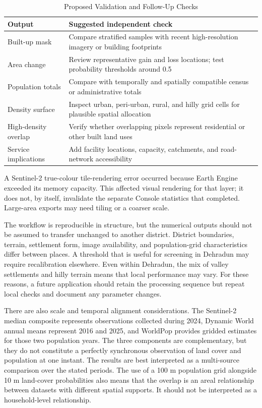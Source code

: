 \documentclass[conference]{IEEEtran}
\begin{document}
\begin{table}[!t]
\caption{Proposed Validation and Follow-Up Checks}
\label{tab:validation}
\centering
\footnotesize
\begin{tabular}{p{}p{}}
\toprule
\textbf{Output}&\textbf{Suggested independent check}\\
\midrule
Built-up mask&Compare stratified samples with recent high-resolution imagery or building footprints\\
Area change&Review representative gain and loss locations; test probability thresholds around 0.5\\
Population totals&Compare with temporally and spatially compatible census or administrative totals\\
Density surface&Inspect urban, peri-urban, rural, and hilly grid cells for plausible spatial allocation\\
High-density overlap&Verify whether overlapping pixels represent residential or other built land uses\\
Service implications&Add facility locations, capacity, catchments, and road-network accessibility\\
\bottomrule
\end{tabular}
\end{table}


A Sentinel-2 true-colour tile-rendering error occurred because Earth Engine exceeded its memory capacity. This affected visual rendering for that layer; it does not, by itself, invalidate the separate Console statistics that completed. Large-area exports may need tiling or a coarser scale.

The workflow is reproducible in structure, but the numerical outputs should not be assumed to transfer unchanged to another district. District boundaries, terrain, settlement form, image availability, and population-grid characteristics differ between places. A threshold that is useful for screening in Dehradun may require recalibration elsewhere. Even within Dehradun, the mix of valley settlements and hilly terrain means that local performance may vary. For these reasons, a future application should retain the processing sequence but repeat local checks and document any parameter changes.

There are also scale and temporal alignment considerations. The Sentinel-2 median composite represents observations collected during 2024, Dynamic World annual means represent 2016 and 2025, and WorldPop provides gridded estimates for those two population years. The three components are complementary, but they do not constitute a perfectly synchronous observation of land cover and population at one instant. The results are best interpreted as a multi-source comparison over the stated periods. The use of a 100 m population grid alongside 10 m land-cover probabilities also means that the overlap is an areal relationship between datasets with different spatial supports. It should not be interpreted as a household-level relationship.
\end{document}
